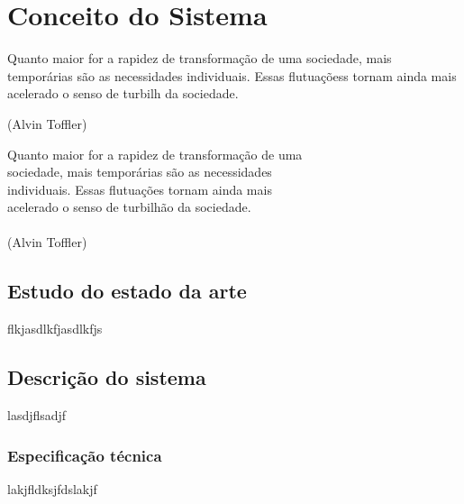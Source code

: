 \chapter{Conceito do Sistema}
\label{chap:concep}

\begin{flushright}

   \begin{list}{}{
      \setlength{\leftmargin}{4.5cm}
      \setlength{\rightmargin}{0cm}
      \setlength{\labelwidth}{0pt}
      \setlength{\labelsep}{\leftmargin}}
      \item Quanto maior for a rapidez de transformação de uma
      sociedade, mais temporárias são as necessidades
      individuais. Essas flutuaçõess tornam ainda mais acelerado
      o senso de turbilh da sociedade.

      \begin{list}{}{
      \setlength{\leftmargin}{0cm}
      \setlength{\rightmargin}{0cm}
      \setlength{\labelwidth}{0pt}
      \setlength{\labelsep}{\leftmargin}}
      \item (Alvin Toffler)
      \end{list}
   \end{list}
\end{flushright}

\begin{flushright}
  Quanto maior for a rapidez de transformação de uma \\
  sociedade, mais temporárias são as necessidades \\
  individuais. Essas flutuações tornam ainda mais \\
  acelerado o senso de turbilhão da sociedade. \\
  \ \\
  (Alvin Toffler)
\end{flushright}

\section{Estudo do estado da arte}
\label{sec:sota}
flkjasdlkfjasdlkfjs

\section{Descrição do sistema}
\label{sec:desc}
lasdjflsadjf

\subsection{Especificação técnica}
\label{ssec:espt}
lakjfldksjfdslakjf


